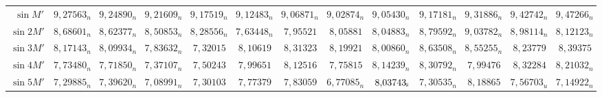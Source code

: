 \begin{landscape}
\begin{center}
\begin{tabular}{@{}r|*{11}{r|}r@{}}
\(\sin M'\) & \(9{,}27563_n\) & \(9{,}24890_n\) & \(9{,}21609_n\) & \(9{,}17519_n\) & \(9{,}12483_n\) & \(9{,}06871_n\) & \(9{,}02874_n\) & \(9{,}05430_n\) & \(9{,}17181_n\) & \(9{,}31886_n\) & \(9{,}42742_n\) & \(9{,}47266_n\)\\
\(\sin 2M'\) & \(8{,}68601_n\) & \(8{,}62377_n\) & \(8{,}50853_n\) & \(8{,}28556_n\) & \(7{,}63448_n\) & \(7{,}95521\) & \(8{,}05881\) & \(8{,}04883_n\) & \(8{,}79592_n\) & \(9{,}03782_n\) & \(8{,}98114_n\) & \(8{,}12123_n\)\\
\(\sin 3M'\) & \(8{,}17143_n\) & \(8{,}09934_n\) & \(7{,}83632_n\) & \(7{,}32015\) & \(8{,}10619\) & \(8{,}31323\) & \(8{,}19921\) & \(8{,}00860_n\) & \(8{,}63508_n\) & \(8{,}55255_n\) & \(8{,}23779\) & \(8{,}39375\)\\
\(\sin 4M'\) & \(7{,}73480_n\) & \(7{,}71850_n\) & \(7{,}37107_n\) & \(7{,}50243\) & \(7{,}99651\) & \(8{,}12516\) & \(7{,}75815\) & \(8{,}14239_n\) & \(8{,}30792_n\) & \(7{,}99476\) & \(8{,}32284\) & \(8{,}21032_n\)\\
\(\sin 5M'\) & \(7{,}29885_n\) & \(7{,}39620_n\) & \(7{,}08991_n\) & \(7{,}30103\) & \(7{,}77379\) & \(7{,}83059\) & \(6{,}77085_n\) & \(8{,}03743_{\text{\rotatebox{90}{$\scriptstyle n$}}}\) & \(7{,}30535_n\) & \(8{,}18865\) & \(7{,}56703_u\) & \(7{,}14922_n\)\\
\end{tabular}
\end{center}
\endgroup
\end{landscape}


